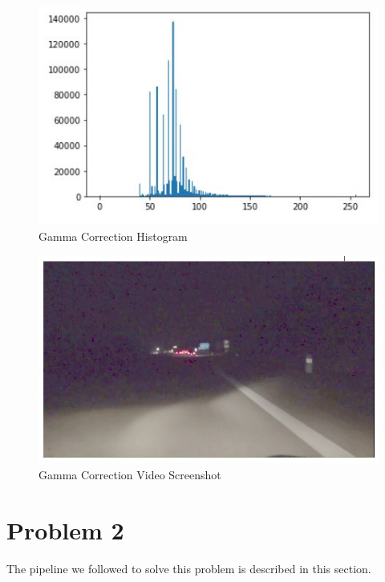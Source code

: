\documentclass[12pt]{report}
\begin{document}
{\begin{figure}[h!]
    \centering
    \includegraphics[scale=0.65]{Capture7.JPG}
    \caption{Gamma Correction Histogram}
    \label{fig:my_label2}
\end{figure}
\begin{figure}[h!]
    \centering
    \includegraphics[scale=0.4]{Capture8.JPG}
    \caption{Gamma Correction Video Screenshot}
    \label{fig:my_label2}
\end{figure}
\vspace{50mm}



\newline

\section*{Problem 2}
The pipeline we followed to solve this problem is described in this section.
}
\end{document}
